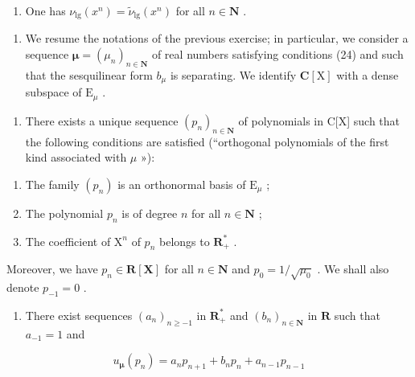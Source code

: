 \begin{enumerate}
\def\labelenumi{\roman{enumi})}
\tightlist
\item
  One has \(\nu_{\mathrm{lg}}(x^n) = \widetilde{\nu}_{\mathrm{lg}}(x^n)\) for all \(n\in \mathbf{N}\) .
\end{enumerate}

\begin{enumerate}
\def\labelenumi{\arabic{enumi})}
\setcounter{enumi}{22}
\tightlist
\item
  We resume the notations of the previous exercise; in particular, we consider a sequence \(\boldsymbol{\mu} = (\mu_n)_{n\in \mathbf{N}}\) of real numbers satisfying conditions (24) and such that the sesquilinear form \(b_{\mu}\) is separating. We identify \(\mathbf{C}[\mathrm{X}]\) with a dense subspace of \(\mathrm{E}_{\mu}\) .
\end{enumerate}

\begin{enumerate}
\def\labelenumi{\alph{enumi})}
\tightlist
\item
  There exists a unique sequence \((p_{n})_{n\in\mathbf{N}}\) of polynomials in C{[}X{]} such that the following conditions are satisfied (“orthogonal polynomials of the first kind associated with \(\mu\) »):
\end{enumerate}

\begin{enumerate}
\def\labelenumi{(\roman{enumi})}
\item
  The family \((p_n)\) is an orthonormal basis of \(\mathrm{E}_{\mu}\) ;
\item
  The polynomial \(p_n\) is of degree \(n\) for all \(n \in \mathbf{N}\) ;
\item
  The coefficient of \(\mathrm{X}^n\) of \(p_n\) belongs to \(\mathbf{R}_+^*\) .
\end{enumerate}

Moreover, we have \(p_n \in \mathbf{R}[\mathbf{X}]\) for all \(n \in \mathbf{N}\) and \(p_0 = 1 / \sqrt{\mu_0}\) . We shall also denote \(p_{-1} = 0\) .

\begin{enumerate}
\def\labelenumi{\alph{enumi})}
\setcounter{enumi}{1}
\tightlist
\item
  There exist sequences \((a_{n})_{n\geqslant -1}\) in \(\mathbf{R}_{+}^{*}\) and \((b_{n})_{n\in \mathbf{N}}\) in \(\mathbf{R}\) such that \(a_{-1} = 1\) and
\end{enumerate}

\[
u _ {\pmb {\mu}} (p _ {n}) = a _ {n} p _ {n + 1} + b _ {n} p _ {n} + a _ {n - 1} p _ {n - 1}
\]

